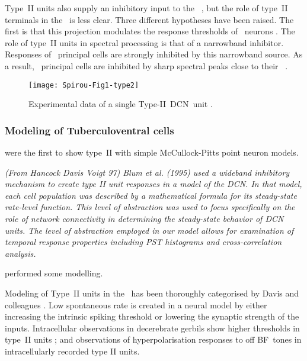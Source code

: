 
Type~II units also supply an inhibitory input to the \VCN~\citep{WickesbergOertel:1990}, but the role of type~II terminals in the \VCN~is less clear.
Three different hypotheses have been raised.
The first is that this projection modulates the response thresholds of \VCN~neurons \citep{PaoliniClark:1998}.
The role of type~II units in spectral processing is that of a narrowband inhibitor. Responses of \DCN~principal cells are strongly inhibited by this narrowband source.
As a result, \DCN~principal cells are inhibited by sharp spectral peaks close to their \BF~\citep{SpirouDavisEtAl:1999}.


\begin{figure}[htb]
\centering
\texttt{[image: Spirou-Fig1-type2]}
\caption[Experimental data of a single Type-II~DCN~unit]{Experimental data of a single Type-II~DCN~unit \citep[Fig.~1]{SpirouDavisEtAl:1999}.
}
\label{fig:SpirouFig1}
\end{figure}


\subsubsection{Modeling of Tuberculoventral cells}



\citet{ArleKim:1991a} were the first to show type~II \EIRA  with simple McCullock-Pitts point neuron models.


{\it (From Hancock Davis Voigt 97) Blum et al. (1995) used a wideband inhibitory   mechanism to create type II unit responses in a model of the DCN. In that   model, each cell population was described by a mathematical formula for its   steady-state rate-level function. This level of abstraction was used to focus   specifically on the role of network connectivity in determining the   steady-state behavior of DCN units. The level of abstraction employed in our   model allows for examination of temporal response properties including PST   histograms and cross-correlation analysis.}

\citep{DunnVetterEtAl:1996} performed some modelling.


Modeling of Type~II units in the \DCN~has been thoroughly categorised by Davis and colleagues \citep{YoungDavis:2002,HancockDavisEtAl:2001,DavisYoung:2000,SpirouDavisEtAl:1999,HancockDavisEtAl:1997,DavisVoigt:1996,DavisVoigt:1994,DavisVoigt:1991}.
 Low spontaneous rate is created in a neural model by either increasing the intrinsic spiking threshold or lowering the synaptic strength of the inputs.
Intracellular observations in decerebrate gerbils show higher thresholds in type~II units \citep{DingVoigt:1997}; and observations of hyperpolarisation responses to off \gls{BF}~tones in intracellularly recorded type II units.

